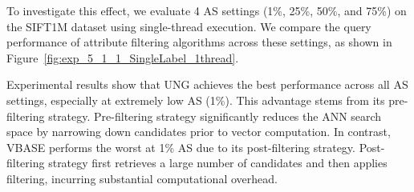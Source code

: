 \documentclass[sigconf, nonacm]{acmart}
\begin{document}
	To investigate this effect, we evaluate 4 AS settings (1\%, 25\%, 50\%, and 75\%) on the SIFT1M dataset using single-thread execution. We compare the query performance of attribute filtering algorithms across these settings, as shown in Figure~\ref{fig:exp_5_1_1_SingleLabel_1thread}.
	
	Experimental results show that UNG achieves the best performance across all AS settings, especially at extremely low AS (1\%). 
	This advantage stems from its pre-filtering strategy. Pre-filtering strategy significantly reduces the ANN search space by narrowing down candidates prior to vector computation. In contrast, VBASE performs the worst at 1\% AS due to its post-filtering strategy. Post-filtering strategy first retrieves a large number of candidates and then applies filtering, incurring substantial computational overhead.
	
	
	
\end{document}
